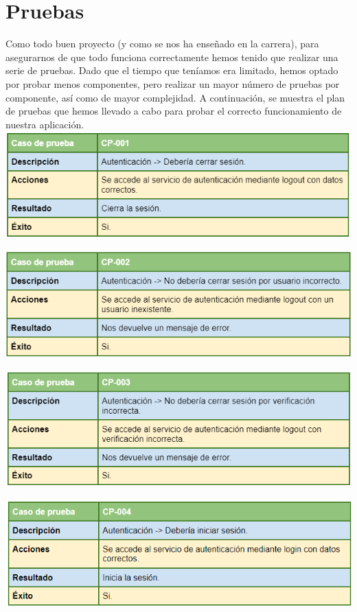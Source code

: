 \chapter{Pruebas}\label{pruebas}

Como todo buen proyecto (y como se nos ha enseñado en la carrera), para asegurarnos de que todo funciona correctamente hemos tenido que realizar una serie de pruebas. Dado que el tiempo que teníamos era limitado, hemos optado por probar menos componentes, pero realizar un mayor número de pruebas por componente, así como de mayor complejidad. A continuación, se muestra el plan de pruebas que hemos llevado a cabo para probar el correcto funcionamiento de nuestra aplicación.\\

\includegraphics[width=\textwidth]{img/cap7/cp-001.png}

\bigskip

\includegraphics[width=\textwidth]{img/cap7/cp-002.png}

\bigskip

\includegraphics[width=\textwidth]{img/cap7/cp-003.png}

\bigskip

\includegraphics[width=\textwidth]{img/cap7/cp-004.png}

